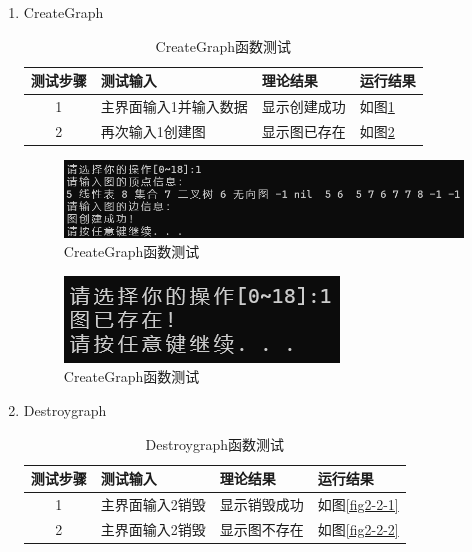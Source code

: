 \documentclass[supercite]{Experimental_Report}
\theoremstyle{definition}
\begin{document}
\begin{enumerate}
	\renewcommand{\labelenumi}{\theenumi)}
	\item CreateGraph
	\begin{table}[h!]
		\begin{center}
			\caption{CreateGraph函数测试}
			\begin{tabular}{|c|p{4cm}<{\centering}|p{4cm}<{\centering}|p{4cm}<{\centering}|} %
				\hline
				\textbf{测试步骤} & \textbf{测试输入} & \textbf{理论结果} & \textbf{运行结果} \\
				\hline
				1 & 主界面输入1并输入数据 & 显示创建成功& 如图\ref{fig2-1-1}\\
				\hline
				2 & 再次输入1创建图 & 显示图已存在 & 如图\ref{fig2-1-2}\\
				\hline
			\end{tabular}
		\end{center}
	\end{table}
	\begin{figure}[H] %
		\begin{center}
			\includegraphics[width=0.5\linewidth]{images/graph/1-1.png}
			\caption{CreateGraph函数测试}
			\label{fig2-1-1}
		\end{center}
	\end{figure}
	\begin{figure}[H] %
		\begin{center}
			\includegraphics[width=0.5\linewidth]{images/graph/1-2.png}
			\caption{CreateGraph函数测试}
			\label{fig2-1-2}
		\end{center}
	\end{figure}
	\item Destroygraph
	\begin{table}[h!]
		\begin{center}
			\caption{Destroygraph函数测试}
			\begin{tabular}{|c|p{4cm}<{\centering}|p{4cm}<{\centering}|p{4cm}<{\centering}|} 
				\hline
				\textbf{测试步骤} & \textbf{测试输入} & \textbf{理论结果} & \textbf{运行结果} \\
				\hline
				1 & 主界面输入2销毁 & 显示销毁成功 & 如图\ref{fig2-2-1}\\
				\hline
				2 & 主界面输入2销毁 & 显示图不存在 & 如图\ref{fig2-2-2}\\
				\hline
			\end{tabular}
		\end{center}
	\end{table}
	

\end{enumerate}
\end{document}
